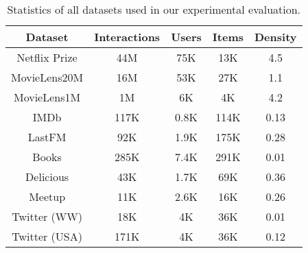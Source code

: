 \documentclass[sigconf]{acmart}
\begin{document}
\begin{table}[htbp]
  \centering
    \begin{tabular}{c|cccc}
    \hline
    \textbf{Dataset} & \textbf{Interactions} & \textbf{Users} & \textbf{Items} & \textbf{ Density} \\
    \hline
    Netflix Prize & 44M   & 75K   & 13K   & 4.5 \\
    MovieLens20M & 16M   & 53K   & 27K   & 1.1 \\
    MovieLens1M & 1M    & 6K    & 4K    & 4.2 \\
IMDb  & 117K  & 0.8K  & 114K  & 0.13 \\
    LastFM & 92K   & 1.9K  & 175K  & 0.28 \\
    Books & 285K  & 7.4K  & 291K  & 0.01 \\
    Delicious & 43K   & 1.7K  & 69K   & 0.36 \\
    Meetup & 11K   & 2.6K  & 16K   & 0.26 \\
Twitter (WW) & 18K   & 4K    & 36K   & 0.01 \\
    Twitter (USA) & 171K  & 4K    & 36K   & 0.12 \\
    \hline
    \end{tabular}\caption{Statistics of all datasets used in our experimental evaluation. }
  \label{tab:dataset}\end{table}
\end{document}
